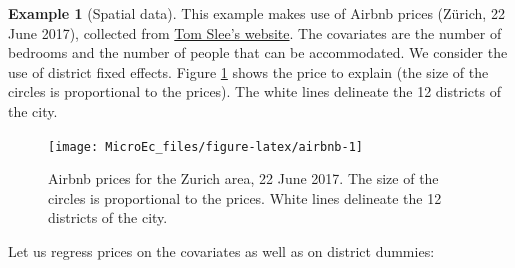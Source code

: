 \documentclass[
  12pt,
]{book}
\theoremstyle{definition}
\theoremstyle{definition}
\newtheorem{example}{Example}[chapter]
\theoremstyle{definition}
\theoremstyle{definition}
\theoremstyle{remark}
\begin{document}
\begin{example}[Spatial data]
\protect\hypertarget{exm:airbnb}{}\label{exm:airbnb}This example makes use of Airbnb prices (Zürich, 22 June 2017), collected from \href{http://tomslee.net/airbnb-data-collection-get-the-data}{Tom Slee's website}. The covariates are the number of bedrooms and the number of people that can be accommodated. We consider the use of district fixed effects. Figure \ref{fig:airbnb} shows the price to explain (the size of the circles is proportional to the prices). The white lines delineate the 12 districts of the city.

\begin{figure}
\texttt{[image: MicroEc\_files/figure-latex/airbnb-1]} \caption{Airbnb prices for the Zurich area, 22 June 2017. The size of the circles is proportional to the prices. White lines delineate the 12 districts of the city.}\label{fig:airbnb}
\end{figure}

Let us regress prices on the covariates as well as on district dummies:


\end{example}
\end{document}

